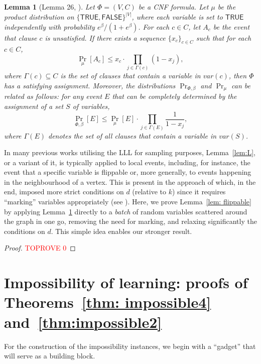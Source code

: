 \documentclass[11pt]{article}
\newtheorem{lemma}[theorem]{Lemma}
\theoremstyle{definition}
\theoremstyle{remark}
\def\TRUE{\mathsf{TRUE}}
\def\FALSE{\mathsf{FALSE}}
\begin{document}
\begin{lemma}[Lemma 26, \cite{GJL19}]
\label{lem:LLL GJL19}\label{lem:L}
    Let $\Phi=(V,C)$ be a CNF formula.
    Let $\mu$ be the product distribution on $\{\TRUE,\FALSE\}^{|V|}$, where each variable is set to $\TRUE$ independently with probability $e^\beta/(1+e^\beta)$.
    For each $c \in C$, let $A_c$ be the event that clause $c$ is unsatisfied.
    If there exists a sequence $\{x_c\}_{c\in C}$ such that 
    for each $c \in C$,
    \begin{equation}
        \label{eq:LLL condition}
        \Pr_\mu[A_c] \le x_c \cdot \prod_{j\in \Gamma(c)} (1 - x_j), 
    \end{equation}
    where $\Gamma(c) \subseteq C$ is the set of clauses that contain a variable in $var(c)$, then $\Phi$ has a satisfying assignment. 
    Moreover, the distributions $\Pr_{\Phi, \beta}$ and $\Pr_\mu$ can be related as follows: for any event $E$ that can be completely determined by the assignment of a set $S$ of variables, 
    \begin{equation}
        \label{eq: LLL translation}
        \Pr_{\Phi, \beta}[E] \le \Pr_\mu[E] \cdot \prod_{j \in \Gamma(E)} \frac{1}{1 - x_j},
    \end{equation}
    where $\Gamma(E)$ denotes the set of all clauses that contain a variable in $var(S)$.
\end{lemma}
In many previous works utilising the LLL for sampling purposes, Lemma~\ref{lem:L}, or a variant of it, is typically applied to  local events, including, for instance, the event that a specific variable  is flippable or, more generally, to events happening in the neighbourhood of a vertex. This is present in the approach of \cite{GKK24} which, in the end, imposed more strict conditions on $d$ (relative to $k$) since it requires ``marking'' variables appropriately (see \cite{Moitra19}).
Here, we prove Lemma~\ref{lem: flippable} by applying Lemma~\ref{lem:LLL GJL19} directly to a \emph{batch} of random variables scattered around the graph in one go, removing the need for marking, and relaxing significantly the conditions on $d$. This simple idea enables our stronger result.


\begin{proof}\textcolor{red}{TOPROVE 0}\end{proof}

\section{Impossibility of learning: proofs of Theorems~\ref{thm: impossible4} and~\ref{thm:impossible2} } 
For the construction of the impossibility instances, we begin with a ``gadget'' that will serve as a building block.
\end{document}
